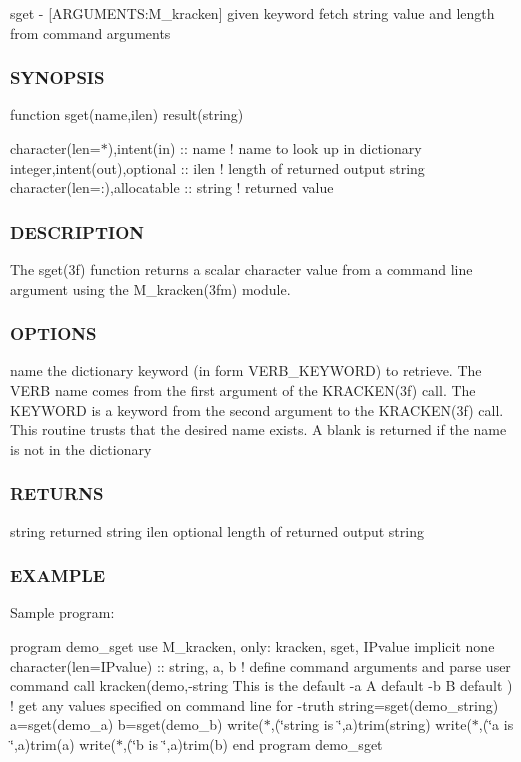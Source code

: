 sget -\/ \mbox{[}A\+R\+G\+U\+M\+E\+N\+TS\+:M\+\_\+kracken\mbox{]} given keyword fetch string value and length from command arguments \subsubsection*{S\+Y\+N\+O\+P\+S\+IS}

function sget(name,ilen) result(string)

character(len=$\ast$),intent(in) \+:\+: name ! name to look up in dictionary integer,intent(out),optional \+:\+: ilen ! length of returned output string character(len=\+:),allocatable \+:\+: string ! returned value

\subsubsection*{D\+E\+S\+C\+R\+I\+P\+T\+I\+ON}

The sget(3f) function returns a scalar character value from a command line argument using the M\+\_\+kracken(3fm) module.

\subsubsection*{O\+P\+T\+I\+O\+NS}

name the dictionary keyword (in form V\+E\+R\+B\+\_\+\+K\+E\+Y\+W\+O\+RD) to retrieve. The V\+E\+RB name comes from the first argument of the K\+R\+A\+C\+K\+E\+N(3f) call. The K\+E\+Y\+W\+O\+RD is a keyword from the second argument to the K\+R\+A\+C\+K\+E\+N(3f) call. This routine trusts that the desired name exists. A blank is returned if the name is not in the dictionary

\subsubsection*{R\+E\+T\+U\+R\+NS}

string returned string ilen optional length of returned output string

\subsubsection*{E\+X\+A\+M\+P\+LE}

Sample program\+:

program demo\+\_\+sget use M\+\_\+kracken, only\+: kracken, sget, I\+Pvalue implicit none character(len=I\+Pvalue) \+:\+: string, a, b ! define command arguments and parse user command call kracken(\textquotesingle{}demo\textquotesingle{},\textquotesingle{}-\/string This is the default -\/a A default -\/b B default\textquotesingle{} ) ! get any values specified on command line for -\/truth string=sget(\textquotesingle{}demo\+\_\+string\textquotesingle{}) a=sget(\textquotesingle{}demo\+\_\+a\textquotesingle{}) b=sget(\textquotesingle{}demo\+\_\+b\textquotesingle{}) write($\ast$,\textquotesingle{}(\char`\"{}string is \char`\"{},a\textquotesingle{})trim(string) write($\ast$,\textquotesingle{}(\char`\"{}a is \char`\"{},a\textquotesingle{})trim(a) write($\ast$,\textquotesingle{}(\char`\"{}b is \char`\"{},a\textquotesingle{})trim(b) end program demo\+\_\+sget


